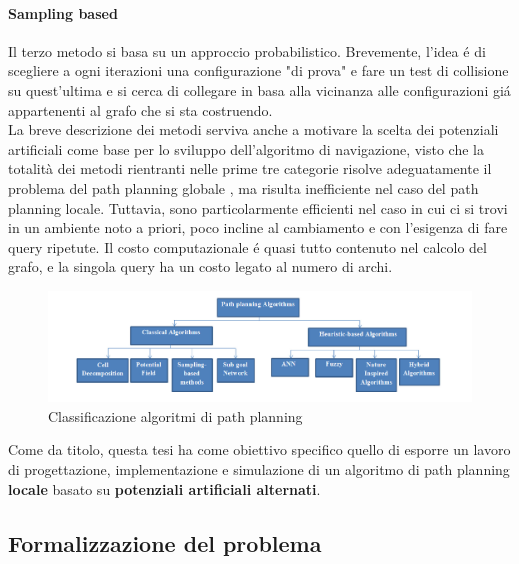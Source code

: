 \documentclass[14pt,a4paper]{extarticle}
\begin{document}
\paragraph{Sampling based} Il terzo metodo si basa su un approccio probabilistico. Brevemente, l'idea é di scegliere a ogni iterazioni una configurazione "di prova" e fare un test di collisione su quest'ultima e si cerca di collegare in basa alla vicinanza alle configurazioni giá appartenenti al grafo che si sta costruendo. \\


La breve descrizione dei metodi serviva anche a motivare la scelta dei potenziali artificiali come base per lo sviluppo dell'algoritmo di navigazione, visto che la totalità dei metodi rientranti nelle prime tre categorie risolve adeguatamente il problema del path planning globale \cite{dalfonso}, ma risulta inefficiente nel caso del path planning locale. Tuttavia, sono particolarmente efficienti nel caso in cui ci si trovi in un ambiente noto a priori, poco incline al cambiamento e con l'esigenza di fare query ripetute. Il costo computazionale é quasi tutto contenuto nel calcolo del grafo, e la singola query ha un costo legato al numero di archi.

\begin{figure}[H]
\caption{Classificazione algoritmi di path planning\cite{mac2016}}
\includegraphics[width=\textwidth]{algoritmiPP.png}
\end{figure}

Come da titolo, questa tesi ha come obiettivo specifico quello di esporre un lavoro di progettazione, implementazione e simulazione di un algoritmo di path planning \textbf{locale} basato su \textbf{potenziali artificiali alternati}. 

\subsection{Formalizzazione del problema} \label{problema}
\end{document}
